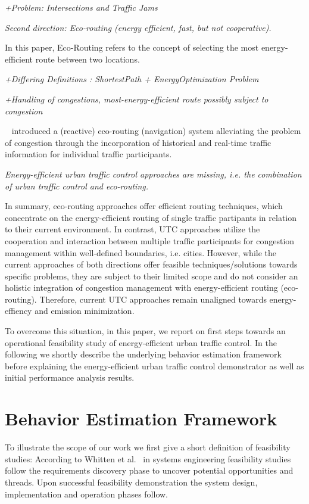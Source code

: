 \documentclass[conference]{../cls/IEEEtran}
\begin{document}
\textit{+Problem: Intersections and Traffic Jams}

\textit{Second direction: Eco-routing (energy efficient, fast, but not
cooperative).}

In this paper, Eco-Routing refers to the concept of selecting the most
energy-efficient route between two locations. 

\textit{+Differing Definitions : ShortestPath + EnergyOptimization Problem
~\cite{Barth2007}}

\textit{+Handling of congestions, most-energy-efficient route possibly
subject to congestion}

 ~\cite{Boriboonsomsin2012} introduced a (reactive) eco-routing (navigation)
 system alleviating the problem of congestion through the
 incorporation of historical and real-time traffic information for individual
 traffic participants.


\textit{Energy-efficient urban traffic control approaches are
missing, i.e.
the combination of urban traffic control and eco-routing.}

In summary, eco-routing approaches offer efficient routing techniques, which
concentrate on the energy-efficient routing of single traffic partipants in
relation to their current environment.  In contrast, UTC approaches utilize the
cooperation and interaction between multiple traffic participants for congestion
management within well-defined boundaries, i.e.
cities. 
However, while the current approaches of both
directions offer feasible techniques/solutions towards specific problems, they are
subject to their limited scope and do not consider an holistic integration of
congestion management with energy-efficient routing (eco-routing). Therefore,
current UTC approaches remain unaligned towards energy-effiency and emission
minimization.

To overcome this situation, in this paper, we report on first steps towards an
operational feasibility study of energy-efficient urban traffic control.
In the following we shortly describe the underlying behavior estimation
framework before explaining the energy-efficient urban traffic control demonstrator as well as initial performance analysis results.

\section{Behavior Estimation Framework}

To illustrate the scope of our work we first give a short definition of feasibility studies: 
According to Whitten et al.~\cite{Whitten2005} in systems engineering feasibility studies follow the requirements discovery phase to uncover potential opportunities and threads.
Upon successful feasibility demonstration the system design, implementation and operation phases follow.
\end{document}
